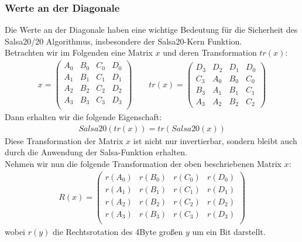 \documentclass[course=erap]{aspdoc}
\begin{document}
\subsubsection{Werte an der Diagonale}

Die Werte an der Diagonale haben eine wichtige Bedeutung für die Sicherheit des Salsa20/20 Algorithmus, insbesondere der Salsa20-Kern Funktion.
\vspace{1mm}
\\Betrachten wir im Folgenden eine Matrix $x$ und deren Transformation $tr(x)$:
\begin{gather*}
    x =
    \begin{pmatrix}
        A_0 & B_0 & C_0 & D_0 \\
        A_1 & B_1 & C_1 & D_1 \\
        A_2 & B_2 & C_2 & D_2 \\
        A_3 & B_3 & C_3 & D_3 \\
    \end{pmatrix}
    \quad \quad tr(x) =
    \begin{pmatrix}
        D_3 & D_2 & D_1 & D_0 \\
        C_3 & A_0 & B_0 & C_0 \\
        B_3 & A_1 & B_1 & C_1 \\
        A_3 & A_2 & B_2 & C_2
    \end{pmatrix}
\end{gather*}
Dann erhalten wir die folgende Eigenschaft:
\begin{gather*}
    Salsa20( tr(x) ) = tr( Salsa20(x) )
\end{gather*}
Diese Transformation der Matrix $x$ ist nicht nur invertierbar, sondern bleibt auch durch die Anwendung der Salsa-Funktion erhalten.\cite{salsa20security}
\vspace{1mm}
\\Nehmen wir nun die folgende Transformation der oben beschriebenen Matrix $x$:
\begin{gather*}
    R(x) =
    \begin{pmatrix}
        r(A_0) & r(B_0) & r(C_0) & r(D_0) \\
        r(A_1) & r(B_1) & r(C_1) & r(D_1) \\
        r(A_2) & r(B_2) & r(C_2) & r(D_2) \\
        r(A_3) & r(B_3) & r(C_3) & r(D_3) \\
    \end{pmatrix}
\end{gather*}
wobei $r(y)$ die Rechtsrotation des 4Byte großen $y$ um ein Bit darstellt.
\end{document}
